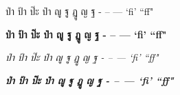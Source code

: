 \documentclass{article}
\begin{document}
ป่า ป้า ป๊ะ ป๋า ญู ฐู ฏู ญ ฐ - -- --- `fi' ``ff"

\textbf{ป่า ป้า ป๊ะ ป๋า ญู ฐู ฏู ญ ฐ - -- --- `fi' ``ff"}

\textit{ป่า ป้า ป๊ะ ป๋า ญู ฐู ฏู ญ ฐ - -- --- `fi' ``ff" }

\textbf{\textit{ป่า ป้า ป๊ะ ป๋า ญู ฐู ฏู ญ ฐ - -- --- `fi' ``ff"}}
\end{document}
